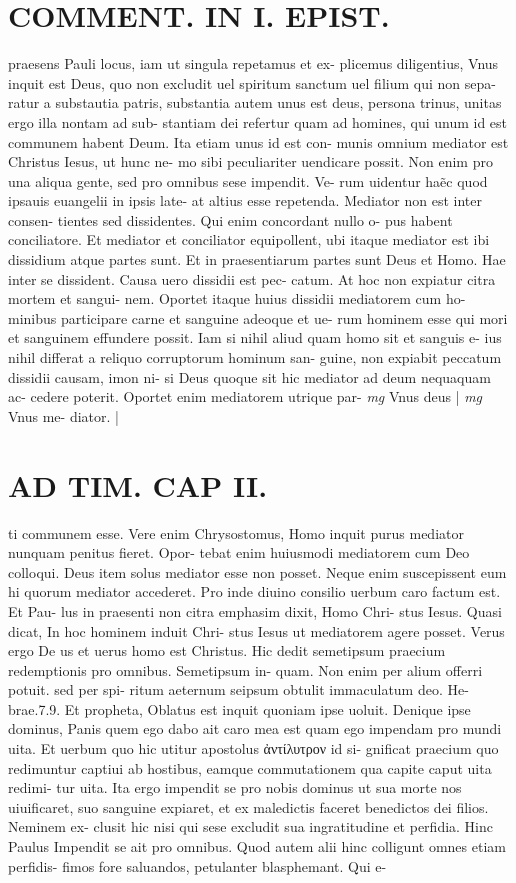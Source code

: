 \documentclass{article}
\begin{document}
\begin{pages}
\section*{COMMENT. IN I. EPIST. }\pstart praesens Pauli locus, iam ut singula repetamus et ex- plicemus diligentius, Vnus inquit est Deus, quo non excludit uel spiritum sanctum uel filium qui non sepa- ratur a substautia patris, substantia autem unus est deus, persona trinus, unitas ergo illa nontam ad sub- stantiam dei refertur quam ad homines, qui unum id est communem habent Deum. Ita etiam unus id est con- munis omnium mediator est Christus Iesus, ut hunc ne- mo sibi peculiariter uendicare possit. Non enim pro una aliqua gente, sed pro omnibus sese impendit. Ve- rum uidentur haẽc quod ipsauis euangelii in ipsis late- at altius esse repetenda. Mediator non est inter consen- tientes sed dissidentes. Qui enim concordant nullo o- pus habent conciliatore. Et mediator et conciliator equipollent, ubi itaque mediator est ibi dissidium atque partes sunt. Et in praesentiarum partes sunt Deus et Homo. Hae inter se dissident. Causa uero dissidii est pec- catum. At hoc non expiatur citra mortem et sangui- nem. Oportet itaque huius dissidii mediatorem cum ho- minibus participare carne et sanguine adeoque et ue- rum hominem esse qui mori et sanguinem effundere possit. Iam si nihil aliud quam homo sit et sanguis e- ius nihil differat a reliquo corruptorum hominum san- guine, non expiabit peccatum dissidii causam, imon ni- si Deus quoque sit hic mediator ad deum nequaquam ac- cedere poterit. Oportet enim mediatorem utrique par-  \pend
\textit{mg}
\footnotesize Vnus deus 
\normalsize| 
\textit{mg}
\footnotesize Vnus me- diator. 
\normalsize| 
\section*{AD TIM. CAP II. }
\marginpar{[ p.117 ]}\pstart ti communem esse. Vere enim Chrysostomus, Homo inquit purus mediator nunquam penitus fieret. Opor- tebat enim huiusmodi mediatorem cum Deo colloqui. Deus item solus mediator esse non posset. Neque enim suscepissent eum hi quorum mediator accederet. Pro inde diuino consilio uerbum caro factum est. Et Pau- lus in praesenti non citra emphasim dixit, Homo Chri- stus Iesus. Quasi dicat, In hoc hominem induit Chri- stus Iesus ut mediatorem agere posset. Verus ergo De us et uerus homo est Christus. Hic dedit semetipsum praecium redemptionis pro omnibus. Semetipsum in- quam. Non enim per alium offerri potuit. sed per spi- ritum aeternum seipsum obtulit immaculatum deo. He- brae.7.9. Et propheta, Oblatus est inquit quoniam ipse uoluit. Denique ipse dominus, Panis quem ego dabo ait caro mea est quam ego impendam pro mundi uita. Et uerbum quo hic utitur apostolus ἀντίλυτρον id si- gnificat praecium quo redimuntur captiui ab hostibus, eamque commutationem qua capite caput uita redimi- tur uita. Ita ergo impendit se pro nobis dominus ut sua morte nos uiuificaret, suo sanguine expiaret, et ex maledictis faceret benedictos dei filios. Neminem ex- clusit hic nisi qui sese excludit sua ingratitudine et perfidia. Hinc Paulus Impendit se ait pro omnibus. Quod autem alii hinc colligunt omnes etiam perfidis- fimos fore saluandos, petulanter blasphemant. Qui e-  \pend

\end{pages}
\end{document}
